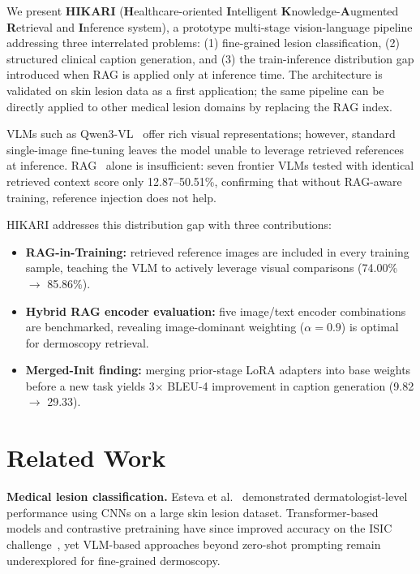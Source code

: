 \documentclass[conference,a4paper]{IEEEtran}
\begin{document}
We present \textbf{HIKARI} (\textbf{H}ealthcare-oriented
\textbf{I}ntelligent \textbf{K}nowledge-\textbf{A}ugmented
\textbf{R}etrieval and \textbf{I}nference system), a prototype
multi-stage vision-language pipeline addressing three interrelated
problems: (1) fine-grained lesion classification,
(2) structured clinical caption generation, and (3) the
train-inference distribution gap introduced when RAG is applied only
at inference time.
The architecture is validated on skin lesion data as a first application;
the same pipeline can be directly applied to other medical lesion domains
by replacing the RAG index.

VLMs such as Qwen3-VL~\cite{qwen2023} offer rich visual representations;
however, standard single-image fine-tuning leaves the model unable to
leverage retrieved references at inference.
RAG~\cite{lewis2020} alone is insufficient: seven frontier VLMs tested
with identical retrieved context score only 12.87--50.51\%, confirming
that without RAG-aware training, reference injection does not help.

HIKARI addresses this distribution gap with three contributions:

\begin{itemize}
  \item \textbf{RAG-in-Training:} retrieved reference images are
        included in every training sample, teaching the VLM to
        actively leverage visual comparisons (74.00\%
        $\rightarrow$ 85.86\%).
  \item \textbf{Hybrid RAG encoder evaluation:} five image/text encoder
        combinations are benchmarked, revealing image-dominant weighting
        ($\alpha{=}0.9$) is optimal for dermoscopy retrieval.
  \item \textbf{Merged-Init finding:} merging prior-stage LoRA adapters
        into base weights before a new task yields 3$\times$ BLEU-4
        improvement in caption generation (9.82 $\rightarrow$ 29.33).
\end{itemize}

\section{Related Work}

\textbf{Medical lesion classification.}
Esteva et al.~\cite{esteva2017} demonstrated dermatologist-level
performance using CNNs on a large skin lesion dataset.  Transformer-based models and contrastive pretraining have since improved
accuracy on the ISIC challenge~\cite{codella2019}, yet VLM-based approaches
beyond zero-shot prompting remain underexplored for fine-grained dermoscopy.
\end{document}
